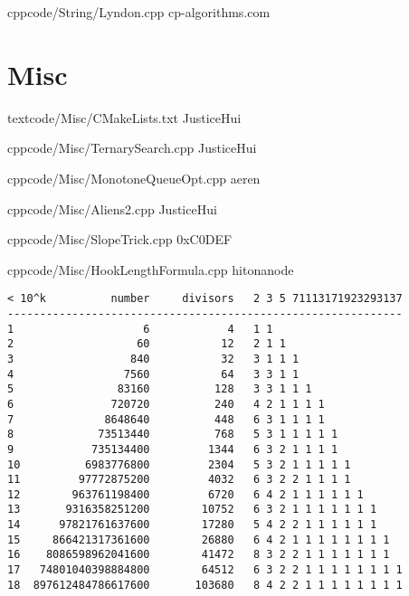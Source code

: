 \documentclass[landscape, 8pt, a4paper, oneside]{extarticle} %
\begin{document}
\begin{multicols*}{3}
{}{}
{cpp}{code/String/Lyndon.cpp}
{cp-algorithms.com}

\section{Misc}

{}{}
{text}{code/Misc/CMakeLists.txt}
{JusticeHui}

{}{}
{cpp}{code/Misc/TernarySearch.cpp}
{JusticeHui}

{}{}
{cpp}{code/Misc/MonotoneQueueOpt.cpp}
{aeren}

{}{}
{cpp}{code/Misc/Aliens2.cpp}
{JusticeHui}

{}{}
{cpp}{code/Misc/SlopeTrick.cpp}
{0xC0DEF}

{}{}
{cpp}{code/Misc/HookLengthFormula.cpp}
{hitonanode} %

%

%

%

\begin{verbatim}
< 10^k          number     divisors   2 3 5 71113171923293137
-------------------------------------------------------------
1                    6            4   1 1
2                   60           12   2 1 1
3                  840           32   3 1 1 1
4                 7560           64   3 3 1 1
5                83160          128   3 3 1 1 1
6               720720          240   4 2 1 1 1 1
7              8648640          448   6 3 1 1 1 1
8             73513440          768   5 3 1 1 1 1 1
9            735134400         1344   6 3 2 1 1 1 1
10          6983776800         2304   5 3 2 1 1 1 1 1
11         97772875200         4032   6 3 2 2 1 1 1 1
12        963761198400         6720   6 4 2 1 1 1 1 1 1
13       9316358251200        10752   6 3 2 1 1 1 1 1 1 1
14      97821761637600        17280   5 4 2 2 1 1 1 1 1 1
15     866421317361600        26880   6 4 2 1 1 1 1 1 1 1 1
16    8086598962041600        41472   8 3 2 2 1 1 1 1 1 1 1
17   74801040398884800        64512   6 3 2 2 1 1 1 1 1 1 1 1
18  897612484786617600       103680   8 4 2 2 1 1 1 1 1 1 1 1


\end{verbatim}
\end{multicols*}
\end{document}
